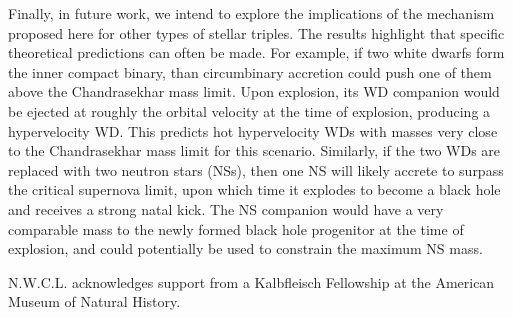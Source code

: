 \documentclass{aastex62}
\begin{document}
Finally, in future work, we intend to explore the implications of the mechanism proposed here for other types of stellar triples.  The results highlight that specific theoretical predictions can often be made.  For example, if two white dwarfs form the inner compact binary, than circumbinary accretion could push one of them above the Chandrasekhar mass limit.  Upon explosion, its WD companion would be ejected at roughly the orbital velocity at the time of explosion, producing a hypervelocity WD.  This predicts hot hypervelocity WDs with masses very close to the Chandrasekhar mass limit for this scenario.  Similarly, if the two WDs are replaced with two neutron stars (NSs), then one NS will likely accrete to surpass the critical supernova limit, upon which time it explodes to become a black hole and receives a strong natal kick.  The NS companion would have a very comparable mass to the newly formed black hole progenitor at the time of explosion, and could potentially be used to constrain the maximum NS mass.

\acknowledgments

N.W.C.L. acknowledges support from a Kalbfleisch Fellowship at the American Museum of Natural History.  
\end{document}

